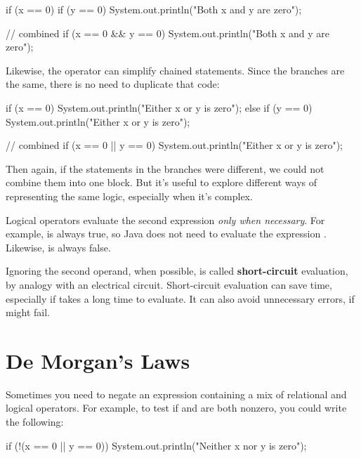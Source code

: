 \begin{code}
if (x == 0) {
    if (y == 0) {
        System.out.println("Both x and y are zero");
    }
}
\end{code}

\begin{code}
// combined
if (x == 0 && y == 0) {
    System.out.println("Both x and y are zero");
}
\end{code}

Likewise, the \java{||} operator can simplify chained  statements.
Since the branches are the same, there is no need to duplicate that code:

\begin{code}
if (x == 0) {
    System.out.println("Either x or y is zero");
} else if (y == 0) {
    System.out.println("Either x or y is zero");
}
\end{code}

\begin{code}
// combined
if (x == 0 || y == 0) {
    System.out.println("Either x or y is zero");
}
\end{code}

Then again, if the statements in the branches were different, we could not combine them into one block.
But it's useful to explore different ways of representing the same logic, especially when it's complex.

\label{shortcircuit}

Logical operators evaluate the second expression {\em only when necessary}.
For example,  is always true, so Java does not need to evaluate the expression .
Likewise,  is always false.

Ignoring the second operand, when possible, is called {\bf short-circuit} evaluation, by analogy with an electrical circuit.
Short-circuit evaluation can save time, especially if  takes a long time to evaluate.
It can also avoid unnecessary errors, if  might fail.


\section{De Morgan's Laws}

Sometimes you need to negate an expression containing a mix of relational and logical operators.
For example, to test if  and  are both nonzero, you could write the following:

\begin{code}
if (!(x == 0 || y == 0)) {
    System.out.println("Neither x nor y is zero");
}
\end{code}

